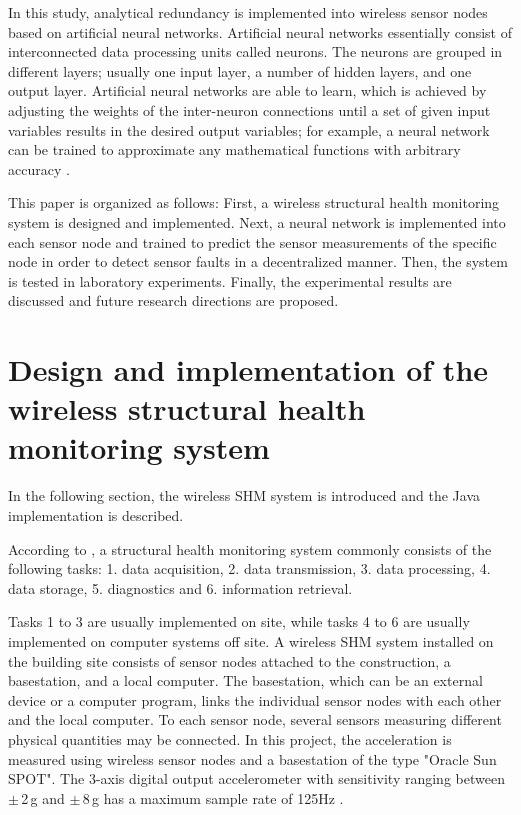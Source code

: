 \documentclass[12pt,a4paper]{scrartcl}
\begin{document}
In this study, analytical redundancy is implemented into wireless sensor nodes based on artificial neural networks.
Artificial neural networks essentially consist of interconnected data processing units called neurons. 
The neurons are grouped in different layers; usually one input layer, a number of hidden layers, and one output layer.
Artificial neural networks are able to learn, which is achieved by adjusting the weights of the inter-neuron connections until a set of given input variables results in the desired output variables; for example, a neural network can be trained to approximate any mathematical functions with arbitrary accuracy \citep{Li2011}.

This paper is organized as follows:
First, a wireless structural health monitoring system is designed and implemented. 
Next, a neural network is implemented into each sensor node and trained to predict the sensor measurements of the specific node in order to detect sensor faults in a decentralized manner. 
Then, the system is tested in laboratory experiments. 
Finally, the experimental results are discussed and future research directions are proposed.


\newpage

\section*{Design and implementation of the wireless structural health monitoring system}
In the following section, the wireless SHM system is introduced and the Java implementation is described.

According to \citet{BisbySHM}, a structural health monitoring system commonly consists of the following tasks:
1. data acquisition,
2. data transmission, 
3. data processing,
4. data storage,
5. diagnostics and 
6. information retrieval.

Tasks 1 to 3 are usually implemented on site, while tasks 4 to 6 are usually implemented on computer systems off site.
A wireless SHM system installed on the building site consists of sensor nodes attached to the construction, a basestation, and a local computer. 
The basestation, which can be an external device or a computer program, links the individual sensor nodes with each other and the local computer.
To each sensor node, several sensors measuring different physical quantities may be connected. 
In this project, the acceleration is measured using wireless sensor nodes and a basestation of the type "Oracle Sun SPOT". 
The 3-axis digital output accelerometer with sensitivity ranging between $\pm$\,2\,g and $\pm$\,8\,g has a maximum sample rate of 125Hz \citep{eDemo2010}.
\end{document}
